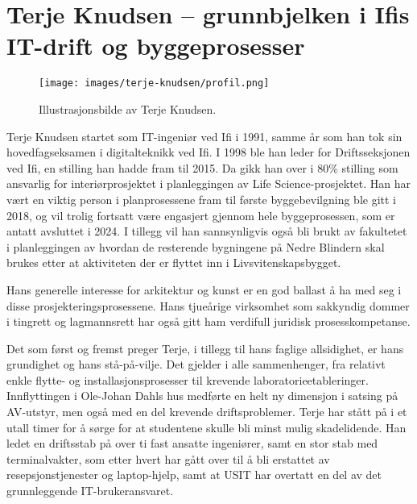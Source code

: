 \chapter[Terje Knudsen]{Terje Knudsen – grunnbjelken i Ifis IT-drift og byggeprosesser}

\author{Skrevet av Narve Trædal}

\begin{wrapfigure}{l}{7cm}
	\centering
	\texttt{[image: images/terje-knudsen/profil.png]}
	\label{fig:terje-knudsen}
	\caption{Illustrasjonsbilde av Terje Knudsen.}
\end{wrapfigure}

Terje Knudsen startet som IT-ingeniør ved Ifi i 1991, samme år som han tok sin hovedfagseksamen i digitalteknikk ved Ifi. I 1998 ble han leder for Driftsseksjonen ved Ifi, en stilling han hadde fram til 2015. Da gikk han over i 80\% stilling som ansvarlig for interiørprosjektet i planleggingen av Life
Science-prosjektet. Han har vært en viktig person i planprosessene fram til første byggebevilgning ble gitt i 2018, og vil trolig fortsatt være engasjert gjennom hele byggeprosessen, som er antatt avsluttet i 2024. I tillegg vil han sannsynligvis også bli brukt av fakultetet i planleggingen av hvordan
de resterende bygningene på Nedre Blindern skal brukes etter at aktiviteten der er flyttet inn i Livsvitenskapsbygget.

Hans generelle interesse for arkitektur og kunst er en god ballast å ha med seg i disse prosjekteringsprosessene. Hans tjueårige virksomhet som sakkyndig dommer i tingrett og lagmannsrett har også gitt ham verdifull juridisk prosesskompetanse.

Det som først og fremst preger Terje, i tillegg til hans faglige allsidighet, er hans grundighet og hans stå-på-vilje. Det gjelder i alle sammenhenger, fra relativt enkle flytte- og installasjonsprosesser til krevende laboratorieetableringer. Innflyttingen i Ole-Johan Dahls hus medførte en helt ny dimensjon i satsing på AV-utstyr, men også med en del krevende driftsproblemer. Terje har stått på i et utall timer for å sørge for at studentene skulle bli minst mulig skadelidende. Han ledet en driftsstab på over ti fast ansatte ingeniører, samt en stor stab med terminalvakter, som etter hvert
har gått over til å bli erstattet av resepsjonstjenester og laptop-hjelp, samt at USIT har overtatt en del av det grunnleggende IT-brukeransvaret.

